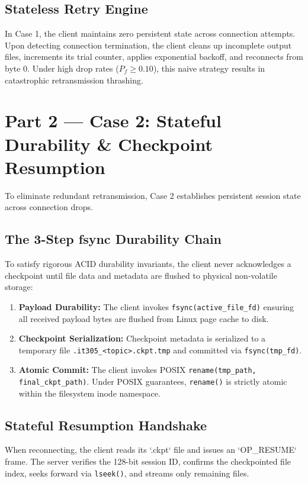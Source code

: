 \documentclass[11pt,a4paper]{article}
\begin{document}
\subsection{Stateless Retry Engine}
In Case 1, the client maintains zero persistent state across connection attempts. Upon detecting connection termination, the client cleans up incomplete output files, increments its trial counter, applies exponential backoff, and reconnects from byte 0. Under high drop rates ($P_f \ge 0.10$), this naive strategy results in catastrophic retransmission thrashing.

\section{Part 2 --- Case 2: Stateful Durability \& Checkpoint Resumption}

To eliminate redundant retransmission, Case 2 establishes persistent session state across connection drops.

\subsection{The 3-Step fsync Durability Chain}
To satisfy rigorous ACID durability invariants, the client never acknowledges a checkpoint until file data and metadata are flushed to physical non-volatile storage:
\begin{enumerate}[leftmargin=*]
    \item \textbf{Payload Durability:} The client invokes \texttt{fsync(active\_file\_fd)} ensuring all received payload bytes are flushed from Linux page cache to disk.
    \item \textbf{Checkpoint Serialization:} Checkpoint metadata is serialized to a temporary file \texttt{.it305\_<topic>.ckpt.tmp} and committed via \texttt{fsync(tmp\_fd)}.
    \item \textbf{Atomic Commit:} The client invokes POSIX \texttt{rename(tmp\_path, final\_ckpt\_path)}. Under POSIX guarantees, \texttt{rename()} is strictly atomic within the filesystem inode namespace.
\end{enumerate}

\subsection{Stateful Resumption Handshake}
When reconnecting, the client reads its `.ckpt` file and issues an `OP_RESUME` frame. The server verifies the 128-bit session ID, confirms the checkpointed file index, seeks forward via \texttt{lseek()}, and streams only remaining files.
\end{document}
